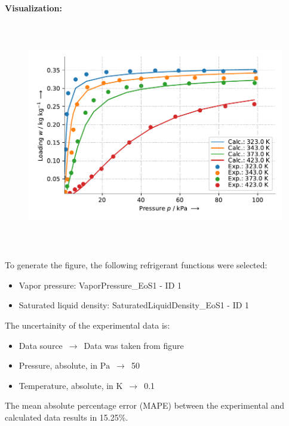 \textbf{Visualization:}
%
\begin{figure}[!htp]
{\noindent\includegraphics[height=10cm, keepaspectratio]{figs/ads/ads_Isobutane_mof_powder_cubtc_DualSiteSips_1.pdf}}
\end{figure}
%

To generate the figure, the following refrigerant functions were selected:
\begin{itemize}
\item Vapor pressure: VaporPressure\_EoS1 - ID 1
\item Saturated liquid density: SaturatedLiquidDensity\_EoS1 - ID 1
\end{itemize}

The uncertainity of the experimental data is:
\begin{itemize}
\item Data source $\,\to\,$ Data was taken from figure
\item Pressure, absolute, in $\si{\pascal}$ $\,\to\,$ 50
\item Temperature, absolute, in $\si{\kelvin}$ $\,\to\,$ 0.1
\end{itemize}

The mean absolute percentage error (MAPE) between the experimental and calculated data results in 15.25\%.
\FloatBarrier
\newpage
